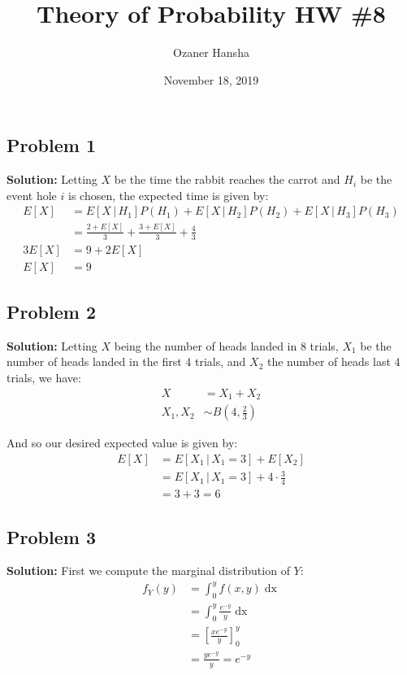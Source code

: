 \documentclass{article}
\newcommand*\eval[3]{\left[#1\right]_{#2}^{#3}}
\newcommand*\pbar[0]{\,|\,}
\begin{document}
\title{Theory of Probability HW \#8}
\author{Ozaner Hansha}
\date{November 18, 2019}
\maketitle

\subsection*{Problem 1}

\noindent\textbf{Solution:} Letting $X$ be the time the rabbit reaches the carrot and $H_i$ be the event hole $i$ is chosen, the expected time is given by:
\begin{align*}
    E[X]&=E[X\pbar H_1]P(H_1)+E[X\pbar H_2]P(H_2)+E[X\pbar H_3]P(H_3)\\
    &=\frac{2+E[X]}{3}+\frac{3+E[X]}{3}+\frac{4}{3}\\
    3E[X]&=9+2E[X]\\
    E[X]&=9
\end{align*}

\subsection*{Problem 2}
\noindent\textbf{Solution:} Letting $X$ being the number of heads landed in 8 trials, $X_1$ be the number of heads landed in the first 4 trials, and $X_2$ the number of heads last 4 trials, we have:
\begin{align*}
    X&=X_1+X_2\tag{convolution of binomial R.V.}\\
    X_1,X_2&\sim B\left(4,\frac{2}{3}\right)
\end{align*}

And so our desired expected value is given by:
\begin{align*}
    E[X]&=E[X_1\pbar X_1=3]+E[X_2]\\
    &=E[X_1\pbar X_1=3]+4\cdot\frac{3}{4}\tag{expectation of binomial R.V.}\\
    &=3+3=6
\end{align*}

\subsection*{Problem 3}
\noindent\textbf{Solution:} First we compute the marginal distribution of $Y$:
\begin{align*}
    f_Y(y)&=\int_0^y f(x,y)\mathop{dx}\\
    &=\int_0^y \frac{e^{-y}}{y}\mathop{dx}\\
    &=\eval{\frac{xe^{-y}}{y}}{0}{y}\\
    &=\frac{ye^{-y}}{y}=e^{-y}
\end{align*}
\end{document}

